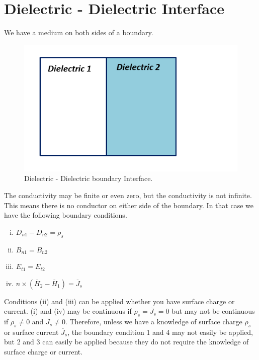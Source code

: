 \section{Dielectric - Dielectric Interface}
We have a medium on both sides of a boundary.
\begin{figure}[h]
\centering
\includegraphics[width=1\linewidth]{./graphics/dielectric_dielectric}
\caption{Dielectric - Dielectric boundary Interface.}
\end{figure}

The conductivity may be finite or even zero, but the conductivity is not infinite. This means there is no conductor on either side of the boundary. In that case we have the following boundary conditions.
\begin{enumerate}[(i)]
\item $D_{n1} - D_{n2} = \rho_s$
\item $B_{n1} = B_{n2}$
\item $E_{t1} = E_{t2}$
\item $\hat{n} \times (\overline{H}_2 - \overline{H}_1) = \overline{J}_s$
\end{enumerate}

Conditions (ii) and (iii) can be applied whether you have surface charge or current. (i) and (iv) may be continuous if $\rho_s = \overline{J}_s = 0$ but may not be continuous if $\rho_s\neq 0$ and $\overline{J}_s\neq 0$.
Therefore, unless we have a knowledge of surface charge $\rho_s$ or surface current $\overline{J}_s$, the boundary condition 1 and 4 may not easily be applied, but 2 and 3 can easily be applied because they do not require the knowledge of surface charge or current.

